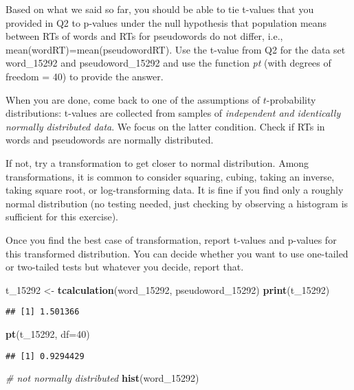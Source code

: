 \documentclass[
]{article}
\newenvironment{Shaded}{\begin{snugshade}}{\end{snugshade}}
\newcommand{\AttributeTok}[1]{\textcolor[rgb]{0.13,0.29,0.53}{#1}}
\newcommand{\CommentTok}[1]{\textcolor[rgb]{0.56,0.35,0.01}{\textit{#1}}}
\newcommand{\DecValTok}[1]{\textcolor[rgb]{0.00,0.00,0.81}{#1}}
\newcommand{\FunctionTok}[1]{\textcolor[rgb]{0.13,0.29,0.53}{\textbf{#1}}}
\newcommand{\NormalTok}[1]{#1}
\newcommand{\OtherTok}[1]{\textcolor[rgb]{0.56,0.35,0.01}{#1}}
\begin{document}
Based on what we said so far, you should be able to tie t-values that
you provided in Q2 to p-values under the null hypothesis that population
means between RTs of words and RTs for pseudowords do not differ, i.e.,
mean(wordRT)=mean(pseudowordRT). Use the t-value from Q2 for the data
set word\_15292 and pseudoword\_15292 and use the function \emph{pt}
(with degrees of freedom = 40) to provide the answer.

When you are done, come back to one of the assumptions of
\(t\)-probability distributions: t-values are collected from samples of
\emph{independent and identically normally distributed data}. We focus
on the latter condition. Check if RTs in words and pseudowords are
normally distributed.

If not, try a transformation to get closer to normal distribution. Among
transformations, it is common to consider squaring, cubing, taking an
inverse, taking square root, or log-transforming data. It is fine if you
find only a roughly normal distribution (no testing needed, just
checking by observing a histogram is sufficient for this exercise).

Once you find the best case of transformation, report t-values and
p-values for this transformed distribution. You can decide whether you
want to use one-tailed or two-tailed tests but whatever you decide,
report that.

\begin{Shaded}
\begin{Highlighting}[]
\NormalTok{t\_15292 }\OtherTok{\textless{}{-}} \FunctionTok{tcalculation}\NormalTok{(word\_15292, pseudoword\_15292)}
\FunctionTok{print}\NormalTok{(t\_15292)}
\end{Highlighting}
\end{Shaded}

\begin{verbatim}
## [1] 1.501366
\end{verbatim}

\begin{Shaded}
\begin{Highlighting}[]
\FunctionTok{pt}\NormalTok{(t\_15292, }\AttributeTok{df=}\DecValTok{40}\NormalTok{)}
\end{Highlighting}
\end{Shaded}

\begin{verbatim}
## [1] 0.9294429
\end{verbatim}

\begin{Shaded}
\begin{Highlighting}[]
\CommentTok{\# not normally distributed}
\FunctionTok{hist}\NormalTok{(word\_15292)}
\end{Highlighting}
\end{Shaded}
\end{document}
